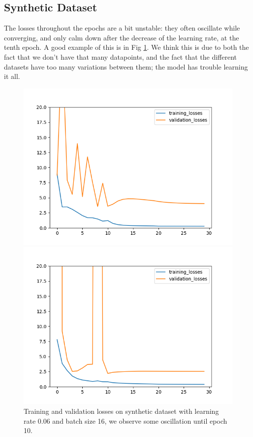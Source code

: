 \documentclass[10pt,conference]{IEEEtran}
\begin{document}
\subsection{Synthetic Dataset}
The losses throughout the epochs are a bit unstable: they often oscillate while converging, and only calm down after the decrease of the learning rate, at the tenth epoch. A good example of this is in Fig \ref{figure:oscillations}. We think this is due to both the fact that we don't have that many datapoints, and the fact that the different datasets have too many variations between them; the model has trouble learning it all. \par

\begin{figure}[h]
  \centering
  \begin{minipage}[h]{0.23\textwidth}
    \includegraphics[width=\textwidth]{images/oscillations.png}
    \caption{Training and validation losses on synthetic dataset with learning rate 0.06 and batch size 16, we observe some oscillation until epoch 10.}
    \label{figure:oscillations}
  \end{minipage}
  \hfill
  \begin{minipage}[h]{0.23\textwidth}
    \includegraphics[width=\textwidth]{images/example_high_lr.png}

\end{minipage}
\end{figure}
\end{document}
